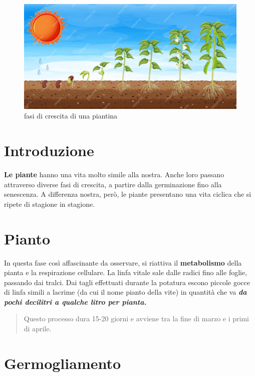 \documentclass[
]{article}
\begin{document}
\begin{figure}

{\centering \includegraphics[width=0.5\linewidth]{immagini/piante} 

}

\caption{fasi di crescita di una piantina}\label{fig:unnamed-chunk-6}
\end{figure}

\hypertarget{introduzione}{%
\section{Introduzione}\label{introduzione}}

\href{https://it.wikipedia.org/wiki/Ky\%C5\%ABjitai}{\color{red}{Kyūjitai}\normalcolor}

\textbf{Le piante} hanno una vita molto simile alla nostra. Anche loro
passano attraverso diverse fasi di crescita, a partire dalla
germinazione fino alla senescenza. A differenza nostra, però, le piante
presentano una vita ciclica che si ripete di stagione in stagione.

\hypertarget{pianto}{%
\section{Pianto}\label{pianto}}

In questa fase così affascinante da osservare, si riattiva il
\textbf{metabolismo} della pianta e la respirazione cellulare. La linfa
vitale sale dalle radici fino alle foglie, passando dai tralci. Dai
tagli effettuati durante la potatura escono piccole gocce di linfa
simili a lacrime (da cui il nome pianto della vite) in quantità che va
\textbf{\emph{da pochi decilitri a qualche litro per pianta.}}

\begin{quote}
Questo processo dura 15-20 giorni e avviene tra la fine di marzo e i
primi di aprile.
\end{quote}

\hypertarget{germogliamento}{%
\section{Germogliamento}\label{germogliamento}}
\end{document}

